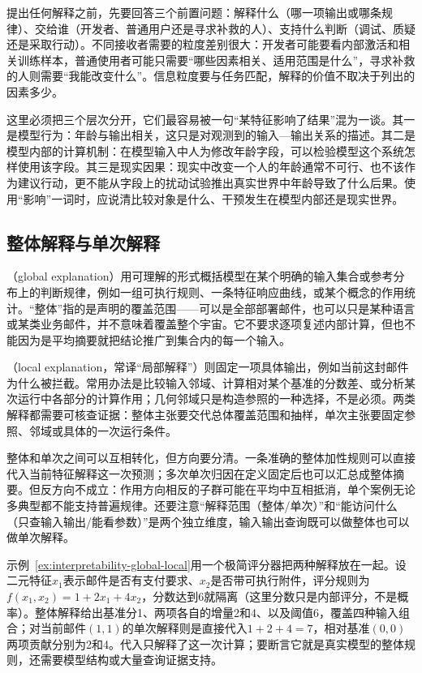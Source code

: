 提出任何解释之前，先要回答三个前置问题：解释什么（哪一项输出或哪条规律）、交给谁（开发者、普通用户还是寻求补救的人）、支持什么判断（调试、质疑还是采取行动）。不同接收者需要的粒度差别很大：开发者可能要看内部激活和相关训练样本，普通使用者可能只需要“哪些因素相关、适用范围是什么”，寻求补救的人则需要“我能改变什么”。信息粒度要与任务匹配，解释的价值不取决于列出的因素多少。

这里必须把三个层次分开，它们最容易被一句“某特征影响了结果”混为一谈。其一是模型行为：年龄与输出相关，这只是对观测到的输入—输出关系的描述。其二是模型内部的计算机制：在模型输入中人为修改年龄字段，可以检验模型这个系统怎样使用该字段。其三是现实因果：现实中改变一个人的年龄通常不可行、也不该作为建议行动，更不能从字段上的扰动试验推出真实世界中年龄导致了什么后果。使用“影响”一词时，应说清比较对象是什么、干预发生在模型内部还是现实世界。

\subsection{整体解释与单次解释}
\label{sec:interpretability-global-local}

（global explanation）用可理解的形式概括模型在某个明确的输入集合或参考分布上的判断规律，例如一组可执行规则、一条特征响应曲线，或某个概念的作用统计。“整体”指的是声明的覆盖范围——可以是全部部署邮件，也可以只是某种语言或某类业务邮件，并不意味着覆盖整个宇宙。它不要求逐项复述内部计算，但也不能因为是平均摘要就把结论推广到集合内的每一个输入。

（local explanation，常译“局部解释”）则固定一项具体输出，例如当前这封邮件为什么被拦截。常用办法是比较输入邻域、计算相对某个基准的分数差、或分析某次运行中各部分的计算作用；几何邻域只是构造参照的一种选择，不是必须。两类解释都需要可核查证据：整体主张要交代总体覆盖范围和抽样，单次主张要固定参照、邻域或具体的一次运行条件。

整体和单次之间可以互相转化，但方向要分清。一条准确的整体加性规则可以直接代入当前特征解释这一次预测；多次单次归因在定义固定后也可以汇总成整体摘要。但反方向不成立：作用方向相反的子群可能在平均中互相抵消，单个案例无论多典型都不能支持普遍规律。还要注意“解释范围（整体/单次）”和“能访问什么（只查输入输出/能看参数）”是两个独立维度，输入输出查询既可以做整体也可以做单次解释。

\begin{example}[同一规则的整体与单次说明]
\label{ex:interpretability-global-local}
示例~\ref{ex:interpretability-global-local}用一个极简评分器把两种解释放在一起。设二元特征$x_1$表示邮件是否有支付要求、$x_2$是否带可执行附件，评分规则为$f(x_1,x_2)=1+2x_1+4x_2$，分数达到6就隔离（这里分数只是内部评分，不是概率）。整体解释给出基准分1、两项各自的增量2和4、以及阈值6，覆盖四种输入组合；对当前邮件$(1,1)$的单次解释则是直接代入$1+2+4=7$，相对基准$(0,0)$两项贡献分别为2和4。代入只解释了这一次计算；要断言它就是真实模型的整体规则，还需要模型结构或大量查询证据支持。
\end{example}

